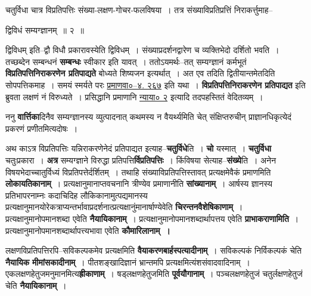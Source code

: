 \documentclass[article,12pt,a4paper]{memoir}
\begin{document}
	चतुर्विधा चात्र विप्रतिपत्तिः संख्या-लक्षण-गोचर-फलविषया । तत्र संख्याविप्रतिप्रत्तिं निराकर्त्तुमाह--  
	  
	द्विविधं सम्यग्ज्ञानम् ॥ २ ॥ 
	  
	द्विविधम् इति--द्वौ विधौ प्रकारावस्येति द्विविधम् । संख्याप्रदर्शनद्वारेण च व्यक्तिभेदो दर्शितो भवति । तच्छब्देन सम्बन्धनं \textbf{सम्बन्धः} स्वीकार इति यावत् । ततोऽयमर्थः--तत् सम्यग्ज्ञानं कर्मभूतं \textbf{विप्रतिपत्तिनिराकरणेन प्रतिपाद्यते} बोध्यते शिष्यजन इत्यर्थात् । अत एव तदिति द्वितीयान्तमेतदिति सोपपत्तिकमाह । समयं स्मर्यते परः \href{http://sarit.indology.info/?cref=pv.4.267}{प्रमाणवा०--४. २६७} इति यथा । \textbf{विप्रतिपत्तिनिराकरणेन प्रतिपाद्यत} इति ब्रुवता लक्षणं नं विरुध्यते । प्रसिद्धानि प्रमाणानि  \href{http://sarit.indology.info/?cref=nā.2}{न्याया० २} इत्यादि तदपहस्तितं वेदितव्यम् ।
	\pend
      

	  \pstart ननु \textbf{वार्त्तिका}दिनैव सम्यग्ज्ञानस्य व्युत्पादनात् कथमस्य न वैयर्थ्यमिति चेत् संक्षिप्तरुचीन् प्राज्ञानधिकृत्येदं प्रकरणं प्रणीतमित्यदोषः ।
	\pend
      

	  \pstart अथ काऽत्र विप्रतिपत्तिः यन्निराकरणेनेदं प्रतिपाद्यत इत्याह--\textbf{चतुर्विधे}ति । \textbf{चो} यस्मात् । \textbf{चतुर्विधा} चतुःप्रकारा । \textbf{अत्र} सम्यग्ज्ञाने विरुद्धा प्रतिपत्ति\textbf{र्विप्रतिपत्तिः} । किंविषया सेत्याह--\textbf{संख्ये}ति । अनेन विषयभेदाच्चातुर्विध्यं विप्रतिपत्तेर्दर्शितम् । तथाहि संख्याविप्रतिपत्तिस्तावत् प्रत्यक्षमेवैकं प्रमाणमिति \textbf{लोकायतिकानाम्} । प्रत्यक्षानुमानाप्तवचनानि त्रीण्येव प्रमाणानीति \textbf{सांख्यानाम्} । आर्षस्य ज्ञानस्य प्रतिभापरनाम्नः कदाचिदिह लौकिकानामुत्पद्यमानस्य प्रत्यक्षानुमानयोरेकत्राप्यन्तर्भावाप्रदर्शनात्प्रत्यक्षानुंमानार्षाण्येवेति \textbf{चिरन्तनवैशेषिकाणाम्} । प्रत्यक्षानुमानोपमानशब्दा एवेति \textbf{नैयायिकानाम्} । प्रत्यक्षानुमानोपमानशब्दार्थापत्तय एवेति \textbf{प्राभाकराणामिति} । प्रत्यक्षानुमानोपमानशब्दार्थापत्त्यभावा एवेति \textbf{कौमारिलानाम् ।}
	\pend
      

	  \pstart लक्षणविप्रतिपत्तिरपि--सविकल्पकमेव प्रत्यक्षमिति \textbf{वैयाकरणबार्हस्पत्यादीनाम्} । सविकल्पकं निर्विकल्पकं चेति \textbf{नैयायिक} \leavevmode{} \textbf{मीमांसकादीनाम्} । पीतशङ्खादिज्ञानं भ्रान्तमपि प्रत्यक्षमित्यंशसंवादवादिनाम् । एकलक्षणहेतुजमनुमानमित्य\textbf{ह्रीकाणाम्} । षड्लक्षणहेतुजमिति \textbf{पूर्वयौगानाम्} । पञ्चलक्षणहेतुजं चतुर्लक्षणहेतुजं चेति \textbf{नैयायिकानाम्} ।
	\pend
      
\end{document}
